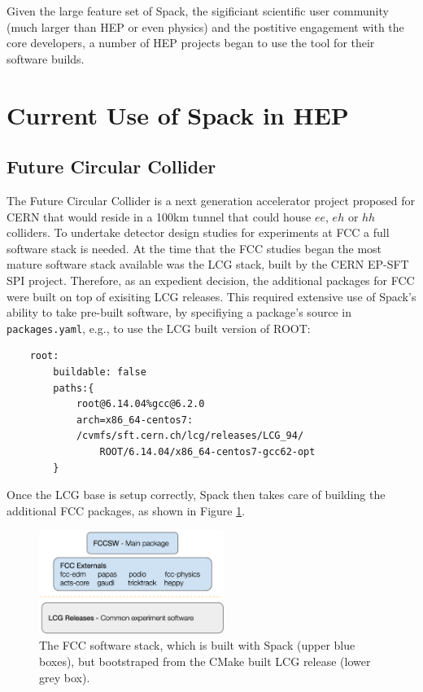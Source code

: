 \documentclass{webofc}
\begin{document}
Given the large feature set of Spack, the sigificiant scientific user community
(much larger than HEP or even physics) and the postitive engagement with the
core developers, a number of HEP projects began to use the tool for their
software builds.

\section{Current Use of Spack in HEP}
\label{hep-spack-use}

\subsection{Future Circular Collider}
\label{fcc}

The Future Circular Collider\cite{Benedikt:2653673} is a next generation
accelerator project proposed for CERN that would reside in a 100km tunnel that
could house $ee$, $eh$ or $hh$ colliders. To undertake detector design studies
for experiments at FCC a full software stack is needed. At the time that the FCC
studies began the most mature software stack available was the LCG stack, built
by the CERN EP-SFT SPI project\cite{LCGStack}. Therefore, as an expedient
decision, the additional packages for FCC were built on top of exisiting
LCG releases. This required extensive use of Spack's ability to take pre-built
software, by specifiying a package's source in \texttt{packages.yaml}, e.g., to
use the LCG built version of ROOT:

\begin{verbatim}
    root:
        buildable: false
        paths:{
            root@6.14.04%gcc@6.2.0
            arch=x86_64-centos7:
            /cvmfs/sft.cern.ch/lcg/releases/LCG_94/
                ROOT/6.14.04/x86_64-centos7-gcc62-opt
        }
\end{verbatim}

Once the LCG base is setup correctly, Spack then takes care of building the
additional FCC packages, as shown in Figure \ref{fig:fcc-stack}.

\begin{figure}[h]
    \centering
    \includegraphics[width=6cm]{fcc-stack.png}
    \caption{The FCC software stack, which is built with Spack (upper blue boxes),
    but bootstraped from the CMake built LCG release (lower grey box).}
    \label{fig:fcc-stack}
\end{figure}
\end{document}
